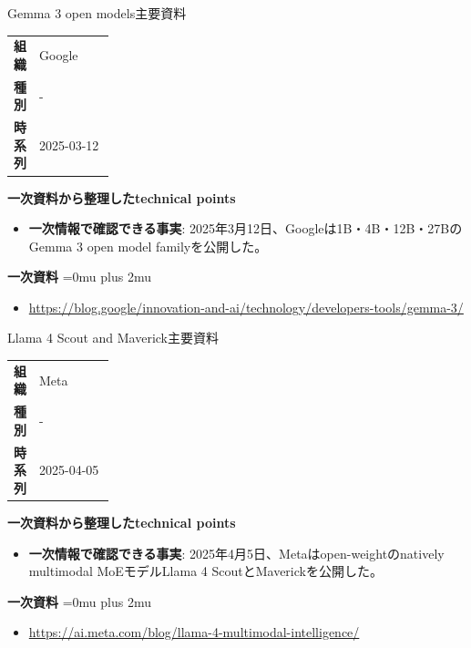 \begin{technicalnote}{Gemma 3 open models}{主要資料}
\begingroup
\begin{tabularx}{\linewidth}{@{}>{\bfseries}p{0.22\linewidth}X@{}}
組織 & Google \\
種別 & - \\
時系列 & 2025-03-12 \\
\end{tabularx}
\smallskip
{\bfseries 一次資料から整理したtechnical points}
\begin{itemize}[leftmargin=1.5em,itemsep=0.35em]
\item \textbf{一次情報で確認できる事実}: 2025年3月12日、Googleは1B・4B・12B・27BのGemma 3 open model familyを公開した。
\end{itemize}
\begin{samepage}
{\bfseries 一次資料}
\begingroup\sloppy
\Urlmuskip=0mu plus 2mu\relax
\begin{itemize}[leftmargin=1.5em,itemsep=0.25em]
\item {\scriptsize\url{https://blog.google/innovation-and-ai/technology/developers-tools/gemma-3/}}
\end{itemize}
\endgroup
\end{samepage}
\endgroup
\end{technicalnote}
\medskip

\begin{technicalnote}{Llama 4 Scout and Maverick}{主要資料}
\begingroup
\begin{tabularx}{\linewidth}{@{}>{\bfseries}p{0.22\linewidth}X@{}}
組織 & Meta \\
種別 & - \\
時系列 & 2025-04-05 \\
\end{tabularx}
\smallskip
{\bfseries 一次資料から整理したtechnical points}
\begin{itemize}[leftmargin=1.5em,itemsep=0.35em]
\item \textbf{一次情報で確認できる事実}: 2025年4月5日、Metaはopen-weightのnatively multimodal MoEモデルLlama 4 ScoutとMaverickを公開した。
\end{itemize}
\begin{samepage}
{\bfseries 一次資料}
\begingroup\sloppy
\Urlmuskip=0mu plus 2mu\relax
\begin{itemize}[leftmargin=1.5em,itemsep=0.25em]
\item {\scriptsize\url{https://ai.meta.com/blog/llama-4-multimodal-intelligence/}}
\end{itemize}
\endgroup
\end{samepage}
\endgroup
\end{technicalnote}
\medskip

